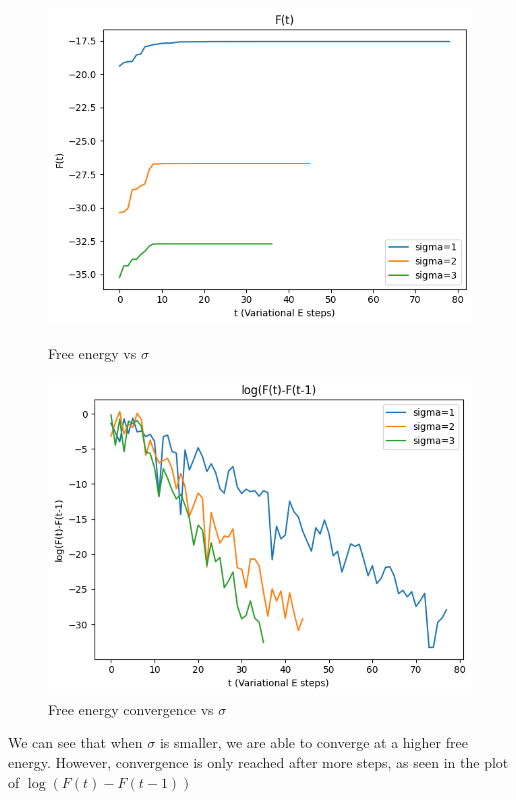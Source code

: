 \documentclass[12pt]{article}
\begin{document}
\begin{figure}[h]
\centering
\begin{minipage}{.5\textwidth}
  \centering
\includegraphics[scale=0.4]{outputs/q3/g-free-energy-sigma}
\caption{Free energy vs $\sigma$}
\label{fig:3g-free-energy-diff-sigma}
\end{minipage}%
\begin{minipage}{.5\textwidth}
  \centering
\includegraphics[scale=0.4]{outputs/q3/g-free-energy-diff-sigma}
\caption{Free energy convergence vs $\sigma$}
\label{fig:3g-free-energy-diff-sigma}
\end{minipage}
\end{figure}

We can see that when $\sigma$ is smaller, we are able to converge at a higher free energy. However, convergence is only reached after more steps, as seen in the plot of $\log(F(t)-F(t-1))$
\end{document}
